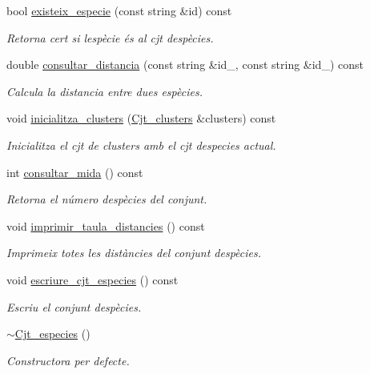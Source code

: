 \begin{DoxyCompactItemize}
bool \hyperlink{class_cjt__especies_a7fa2f303eb4e3065d87174a1c3e71942}{existeix\+\_\+especie} (const string \&id) const
\begin{DoxyCompactList}\small\item\em Retorna cert si l\textquotesingle{}espècie és al cjt d\textquotesingle{}espècies. \end{DoxyCompactList}\item 
double \hyperlink{class_cjt__especies_abcea459e5b302c0eda1583b1dc571bff}{consultar\+\_\+distancia} (const string \&id\+\_, const string \&id\+\_) const
\begin{DoxyCompactList}\small\item\em Calcula la distancia entre dues espècies. \end{DoxyCompactList}\item 
void \hyperlink{class_cjt__especies_a568357e9132b16cfe7280e29e6e89cfb}{inicialitza\+\_\+clusters} (\hyperlink{class_cjt__clusters}{Cjt\+\_\+clusters} \&clusters) const
\begin{DoxyCompactList}\small\item\em Inicialitza el cjt de clusters amb el cjt d\textquotesingle{}especies actual. \end{DoxyCompactList}\item 
int \hyperlink{class_cjt__especies_a2539f8918c40587579e1b98be28bdddc}{consultar\+\_\+mida} () const
\begin{DoxyCompactList}\small\item\em Retorna el número d\textquotesingle{}espècies del conjunt. \end{DoxyCompactList}\item 
void \hyperlink{class_cjt__especies_aeb2402fbb6b5cc5eeea31981c51110bc}{imprimir\+\_\+taula\+\_\+distancies} () const
\begin{DoxyCompactList}\small\item\em Imprimeix totes les distàncies del conjunt d\textquotesingle{}espècies. \end{DoxyCompactList}\item 
void \hyperlink{class_cjt__especies_a8bc985ceafb3bb0e5f3c68ba52a36e86}{escriure\+\_\+cjt\+\_\+especies} () const
\begin{DoxyCompactList}\small\item\em Escriu el conjunt d\textquotesingle{}espècies. \end{DoxyCompactList}\item 
\hyperlink{class_cjt__especies_a05182978f6fff11a0fa1cec49514dd5e}{$\sim$\+Cjt\+\_\+especies} ()
\begin{DoxyCompactList}\small\item\em Constructora per defecte. \end{DoxyCompactList}\end{DoxyCompactItemize}
